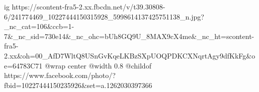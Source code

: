  
 
 
 
 

\ifcmt
  ig https://scontent-fra5-2.xx.fbcdn.net/v/t39.30808-6/241774469_10227444150315928_5998614137425751138_n.jpg?_nc_cat=106&ccb=1-7&_nc_sid=730e14&_nc_ohc=bUh8GQ9U_8MAX9cX4me&_nc_ht=scontent-fra5-2.xx&oh=00_AfD7WltQ8USnGvKqeLKBzSXpUOQPDKCXNqrtAgy9dfKkFg&oe=64783C71
  @wrap center
  @width 0.8
  @childof https://www.facebook.com/photo/?fbid=10227444150235926&set=a.1262030397366
\fi
